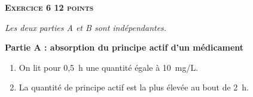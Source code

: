 \documentclass[10pt]{article}
\begin{document}
\bigskip

\textbf{\textsc{Exercice 6 \hfill 12 points}}

\medskip

\emph{Les deux parties {\rm A} et {\rm B} sont indépendantes.}

\medskip

\textbf{Partie A : absorption du principe actif d'un médicament}

\smallskip

%
%
%
%
%
%

\begin{enumerate}
	\item  %
On lit pour 0,5~h une quantité égale à 10~mg/L.	
	\item %
La quantité de principe actif est la plus élevée au bout de 2~h.
\end{enumerate}
\end{document}
